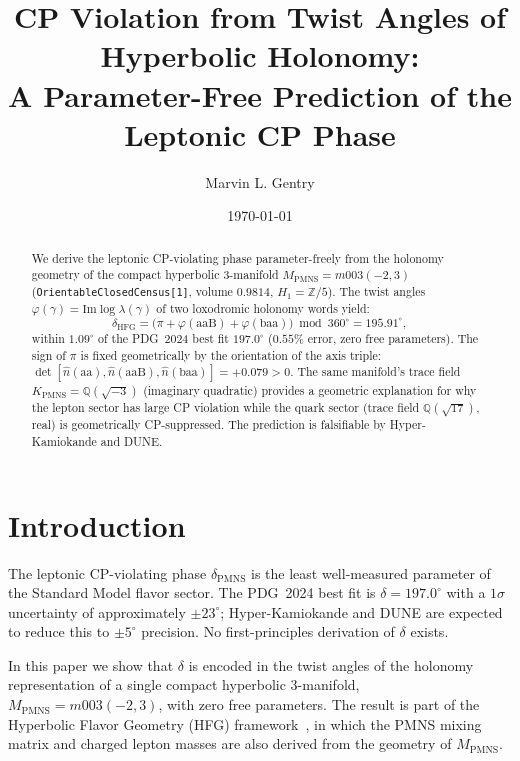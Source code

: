 \documentclass[11pt,a4paper]{article}
\theoremstyle{remark}
\newcommand{\MPMNS}{M_{\mathrm{PMNS}}}
\newcommand{\KPMNS}{K_{\mathrm{PMNS}}}
\newcommand{\Zfive}{\mathbb{Z}/5}
\begin{document}
\title{CP Violation from Twist Angles of Hyperbolic Holonomy:\\
A Parameter-Free Prediction of the Leptonic CP Phase}

\author[1]{Marvin L. Gentry}
\date{\today}

\begin{abstract}
We derive the leptonic CP-violating phase parameter-freely from the
holonomy geometry of the compact hyperbolic 3-manifold
$\MPMNS = m003(-2,3)$ (\texttt{OrientableClosedCensus[1]},
volume $0.9814$, $H_1=\Zfive$).
The twist angles $\varphi(\gamma)=\mathrm{Im}\log\lambda(\gamma)$
of two loxodromic holonomy words yield:
\[
  \delta_{\mathrm{HFG}}
  = \bigl(\pi + \varphi(\mathrm{aaB}) + \varphi(\mathrm{baa})\bigr)
    \bmod 360^\circ
  = 195.91^\circ,
\]
within $1.09^\circ$ of the PDG~2024 best fit $197.0^\circ$
($0.55\%$ error, zero free parameters).
The sign of $\pi$ is fixed geometrically by the orientation of the
axis triple: $\det[\hat{n}(\mathrm{aa}),\hat{n}(\mathrm{aaB}),
\hat{n}(\mathrm{baa})]=+0.079>0$.
The same manifold's trace field $\KPMNS=\mathbb{Q}(\sqrt{-3})$
(imaginary quadratic) provides a geometric explanation for why the
lepton sector has large CP violation while the quark sector
(trace field $\mathbb{Q}(\sqrt{17})$, real) is geometrically CP-suppressed.
The prediction is falsifiable by Hyper-Kamiokande and DUNE.
\end{abstract}

\maketitle

\section{Introduction}
\label{sec:intro}

The leptonic CP-violating phase $\delta_{\mathrm{PMNS}}$ is the least
well-measured parameter of the Standard Model flavor sector.
The PDG~2024 best fit is $\delta=197.0^\circ$ with a $1\sigma$
uncertainty of approximately $\pm23^\circ$; Hyper-Kamiokande and
DUNE are expected to reduce this to $\pm5^\circ$ precision.
No first-principles derivation of $\delta$ exists.

In this paper we show that $\delta$ is encoded in the twist angles
of the holonomy representation of a single compact hyperbolic
3-manifold, $\MPMNS=m003(-2,3)$, with zero free parameters.
The result is part of the Hyperbolic Flavor Geometry (HFG)
framework~\cite{Gentry:Unified}, in which the PMNS mixing matrix
and charged lepton masses are also derived from the geometry of
$\MPMNS$.
\end{document}
